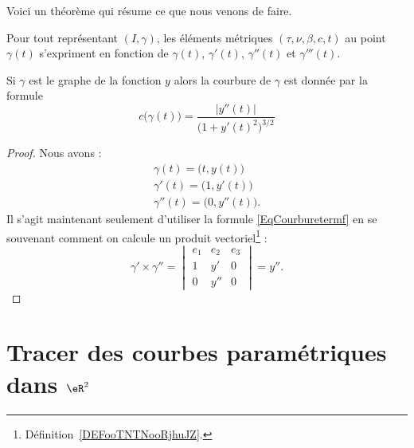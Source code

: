 Voici un théorème qui résume ce que nous venons de faire.
\begin{theorem}		\label{THOooXOVRooRXtEuU}
	Pour tout représentant \( (I,\gamma)\), les éléments métriques \( (\tau,\nu,\beta,c,t)\) au point \( \gamma(t)\) s'expriment en fonction de \( \gamma(t)\), \( \gamma'(t)\), \( \gamma''(t)\) et \( \gamma'''(t)\).
\end{theorem}

\begin{lemma}
	Si \( \gamma\) est le graphe de la fonction \( y\) alors la courbure de \( \gamma\) est donnée par la formule
	\begin{equation}
		c\big( \gamma(t) \big)=\frac{ | y''(t) | }{ \big( 1+y'(t)^2 \big)^{3/2} }
	\end{equation}
\end{lemma}

\begin{proof}
	Nous avons :
	\begin{subequations}
		\begin{align}
			\gamma(t)=\big( t,y(t) \big)   \\
			\gamma'(t)=\big( 1,y'(t) \big) \\
			\gamma''(t)=\big( 0,y''(t) \big).
		\end{align}
	\end{subequations}
	Il s'agit maintenant seulement d'utiliser la formule \eqref{EqCourburetermf} en se souvenant comment on calcule un produit vectoriel\footnote{Définition~\ref{DEFooTNTNooRjhuJZ}.} :
	\begin{equation}
		\gamma'\times \gamma''=
		\begin{vmatrix}
			e_1 & e_2 & e_3 \\
			1   & y'  & 0   \\
			0   & y'' & 0
		\end{vmatrix}=y''.
	\end{equation}
\end{proof}

\section{Tracer des courbes paramétriques dans \( \eR^2\)}     \label{SecTracerParmCourbe}

